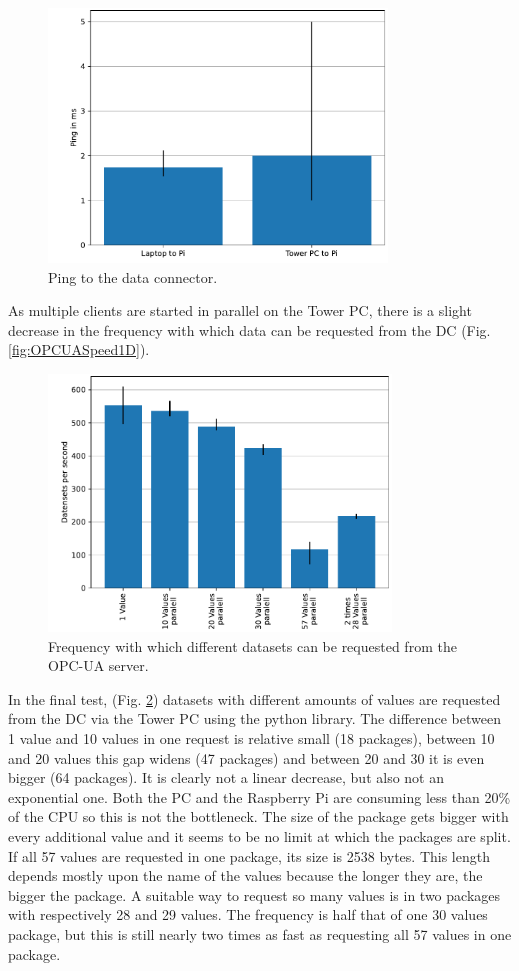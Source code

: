 \documentclass[conference]{IEEEtran}
\begin{document}
\begin{figure}[htbp]
    \centerline{\includegraphics[width=9cm]{Pictures/PingDiagram.pdf}}
    \caption{Ping to the data connector.}
    \label{fig:PingDiagram}
\end{figure}
As multiple clients are started in parallel on the Tower PC, there is a slight decrease in the frequency with which  data can be requested from the DC (Fig. \ref{fig:OPCUASpeed1D}).\\
\begin{figure}[b]
    \centerline{\includegraphics[width=9.1cm]{Pictures/OPCUAMultipleDatenAufEinmal.pdf}}
    \caption{Frequency with which different datasets can be requested from the OPC-UA server.}
    \label{fig:OPCUAMultipleDatenAufEinmal}
\end{figure}
In the final test, (Fig. \ref{fig:OPCUAMultipleDatenAufEinmal}) datasets with different amounts of values are requested from the DC via the Tower PC using the python library.
The difference between 1 value and 10 values in one request is relative small (18 packages), between 10 and 20 values this gap widens (47 packages) and between 20 and 30 it is even bigger (64 packages).
It is clearly not a linear decrease, but also not an exponential one. 
Both the PC and the Raspberry Pi are consuming less than 20\% of the CPU so this is not the bottleneck.
The size of the package gets bigger with every additional value and it seems to be no limit at which the packages are split.
If all 57 values are requested in one package, its size is 2538 bytes.
This length depends mostly upon the name of the values because the longer they are, the bigger the package.
A suitable way to request so many values is in two packages with respectively 28 and 29 values. The frequency is half that of one 30 values package, but this is still nearly two times as fast as requesting all 57 values in one package.
\end{document}
